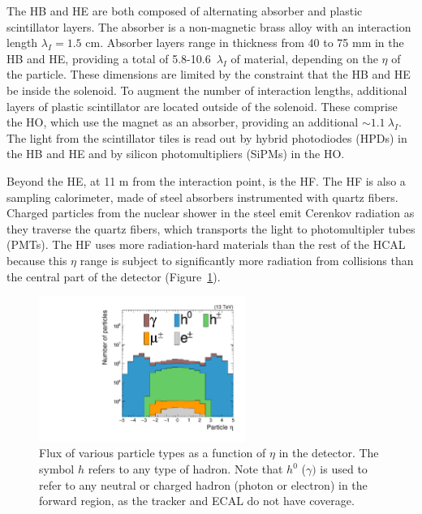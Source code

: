 The HB and HE are both composed of alternating absorber and plastic scintillator layers.
The absorber is a non-magnetic brass alloy with an interaction length $\lambda_I=1.5$ cm.
Absorber layers range in thickness from 40 to 75 mm in the HB and HE, providing a total of 5.8-10.6~$\lambda_I$ of material, depending on the $\eta$ of the particle.
These dimensions are limited by the constraint that the HB and HE be inside the solenoid. 
To augment the number of interaction lengths, additional layers of plastic scintillator are located outside of the solenoid.
These comprise the HO, which use the magnet as an absorber, providing an additional $\sim 1.1~\lambda_I$.
The light from the scintillator tiles is read out by hybrid photodiodes (HPDs) in the HB and HE and by silicon photomultipliers (SiPMs) in the HO. 

Beyond the HE, at 11 m from the interaction point, is the HF.
The HF is also a sampling calorimeter, made of steel absorbers instrumented with quartz fibers.
Charged particles from the nuclear shower in the steel emit Cerenkov radiation as they traverse the quartz fibers, which transports the light to photomultipler tubes (PMTs).
The HF uses more radiation-hard materials than the rest of the HCAL because this $\eta$ range is subject to significantly more radiation from collisions than the central part of the detector (Figure~\ref{fig:cms:flux}). 

\begin{figure}[]
    \begin{center}
        \includegraphics[width=0.6\textwidth]{figures/cms/flux.pdf}
        \caption{Flux of various particle types as a function of $\eta$ in the detector.
             The symbol $h$ refers to any type of hadron.
             Note that $h^0$ ($\gamma)$ is used to refer to any neutral or charged hadron (photon or electron) in the forward region, as the tracker and ECAL do not have coverage.}
        \label{fig:cms:flux}
    \end{center}
\end{figure}

